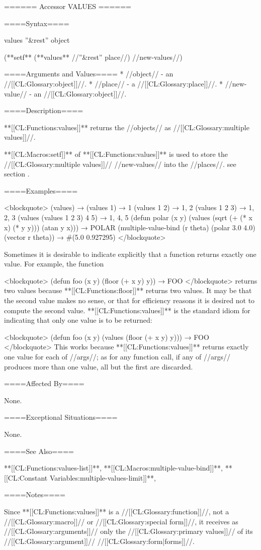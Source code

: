 ====== Accessor VALUES ======

====Syntax====

\DefunWithValues values {''&rest'' object} {}

(**setf** (**values** //''&rest'' place//) //new-values//)

====Arguments and Values====
  * //object// - an //[[CL:Glossary:object]]//.
  * //place// - a //[[CL:Glossary:place]]//.
  * //new-value// - an //[[CL:Glossary:object]]//.

====Description====

**[[CL:Functions:values]]** returns the //objects// as //[[CL:Glossary:multiple values]]//.

**[[CL:Macros:setf]]** of **[[CL:Functions:values]]** is used to store the //[[CL:Glossary:multiple values]]// //new-values// into the //places//. see section {\secref\SETFofVALUES}.

====Examples====

<blockquote> (values) → \novalues (values 1) → 1 (values 1 2) → 1, 2 (values 1 2 3) → 1, 2, 3 (values (values 1 2 3) 4 5) → 1, 4, 5 (defun polar (x y) (values (sqrt (+ (* x x) (* y y))) (atan y x))) → POLAR (multiple-value-bind (r theta) (polar 3.0 4.0) (vector r theta)) → #(5.0 0.927295) </blockquote>

Sometimes it is desirable to indicate explicitly that a function returns exactly one value. For example, the function

<blockquote> (defun foo (x y) (floor (+ x y) y)) → FOO </blockquote> returns two values because **[[CL:Functions:floor]]** returns two values. It may be that the second value makes no sense, or that for efficiency reasons it is desired not to compute the second value. **[[CL:Functions:values]]** is the standard idiom for indicating that only one value is to be returned:

<blockquote> (defun foo (x y) (values (floor (+ x y) y))) → FOO </blockquote> This works because **[[CL:Functions:values]]** returns exactly one value for each of //args//; as for any function call, if any of //args// produces more than one value, all but the first are discarded.

====Affected By====

None.

====Exceptional Situations====

None.

====See Also====

**[[CL:Functions:values-list]]**, **[[CL:Macros:multiple-value-bind]]**, **[[CL:Constant Variables:multiple-values-limit]]**, {\secref\Evaluation}

====Notes====

Since **[[CL:Functions:values]]** is a //[[CL:Glossary:function]]//, not a //[[CL:Glossary:macro]]// or //[[CL:Glossary:special form]]//, it receives as //[[CL:Glossary:arguments]]// only the //[[CL:Glossary:primary values]]// of its //[[CL:Glossary:argument]]// //[[CL:Glossary:form|forms]]//.

  
